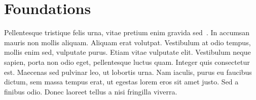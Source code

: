 \section{Foundations}\label{sec:foundations}
Pellentesque tristique felis urna, vitae pretium enim gravida sed~\cite{knuth1968}.
In accumsan mauris non mollis aliquam.
Aliquam erat volutpat.
Vestibulum at odio tempus, mollis enim sed, vulputate purus.
Etiam vitae vulputate elit.
Vestibulum neque sapien, porta non odio eget, pellentesque luctus quam.
Integer quis consectetur est.
Maecenas sed pulvinar leo, ut lobortis urna.
Nam iaculis, purus eu faucibus dictum, sem massa tempus erat, ut egestas lorem eros sit amet justo.
Sed a finibus odio.
Donec laoreet tellus a nisi fringilla viverra.
